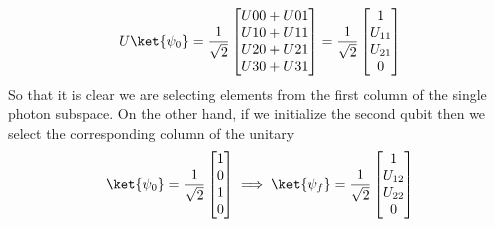 \begin{equation}
    U\ket{\psi_0} =
    \frac{1}{\sqrt{2}}
    \begin{bmatrix}
        U00 + U01 \\
        U10 + U11 \\
        U20 + U21 \\
        U30 + U31 \\
    \end{bmatrix}
    =
    \frac{1}{\sqrt{2}}
    \begin{bmatrix}
        1 \\
        U_{11} \\
        U_{21} \\
        0 \\
    \end{bmatrix}
\end{equation}
So that it is clear we are selecting elements from the first column of the single photon subspace.
On the other hand, if we initialize the second qubit then we select the corresponding column of the unitary
\begin{equation}
    \ket{\psi_0}=\frac{1}{\sqrt{2}}
    \begin{bmatrix}
        1 \\
        0 \\
        1 \\
        0 \\
    \end{bmatrix}
    \implies
    \ket{\psi_{f}}=
    \frac{1}{\sqrt{2}}
    \begin{bmatrix}
        1 \\
        U_{12} \\
        U_{22} \\
        0 \\
    \end{bmatrix}
\end{equation}

